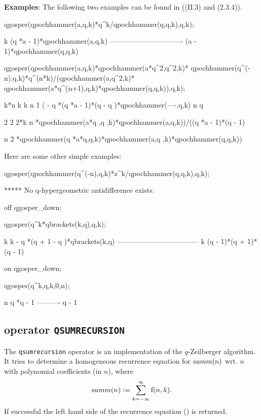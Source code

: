 {\bf Examples}: The following two examples can be found in
	\cite{GasperRahman:90} ((II.3) and (2.3.4)).

\begin{redoutput}
\redprompt qgosper(qpochhammer(a,q,k)*q^k/qpochhammer(q,q,k),q,k);

   k
 (q *a - 1)*qpochhammer(a,q,k)
-------------------------------
  (a - 1)*qpochhammer(q,q,k)

\redprompt qgosper(qpochhammer(a,q,k)*qpochhammer(a*q^2,q^2,k)*
   qpochhammer(q^(-n),q,k)*q^(n*k)/(qpochhammer(a,q^2,k)*
   qpochhammer(a*q^(n+1),q,k)*qpochhammer(q,q,k)),q,k);

     k*n   k          k    n               1
( - q   *(q *a - 1)*(q  - q )*qpochhammer(----,q,k)
                                            n
                                           q

                 2  2                           2*k          n
 *qpochhammer(a*q ,q ,k)*qpochhammer(a,q,k))/((q   *a - 1)*(q  - 1)

               n                         2
 *qpochhammer(q *a*q,q,k)*qpochhammer(a,q ,k)*qpochhammer(q,q,k))
\end{redoutput}

Here are some other simple examples:
\begin{redoutput}
\redprompt qgosper(qpochhammer(q^(-n),q,k)*z^k/qpochhammer(q,q,k),q,k);

***** No q-hypergeometric antidifference exists.

\redprompt off qgosper_down;

\redprompt qgosper(q^k*qbrackets(k,q),q,k);

     k           k
  - q *(q + 1 - q )*qbrackets(k,q)
-----------------------------------
       k
     (q  - 1)*(q + 1)*(q - 1)

\redprompt on qgosper_down;

\redprompt qgosper(q^k,q,k,0,n);

  n
 q *q - 1
----------
  q - 1
\end{redoutput}
%
\subsection{\REDUCE{} operator \texttt{QSUMRECURSION}}
\label{reduce_qsumrecursion}

The \texttt{qsumrecursion} operator is an implementation of the
$q$-Zeilberger algorithm.
It tries to determine a homogeneous recurrence equation for
${\mathrm summ}(n)$ wrt. $n$ with polynomial coefficients (in $n$), where
%
\[
	{\mathrm summ}(n):= \sum_{k=-\infty}^{\infty}{{\mathrm f}(n,k)}.
\]
%
If successful the left hand side of the recurrence equation
() is returned.

